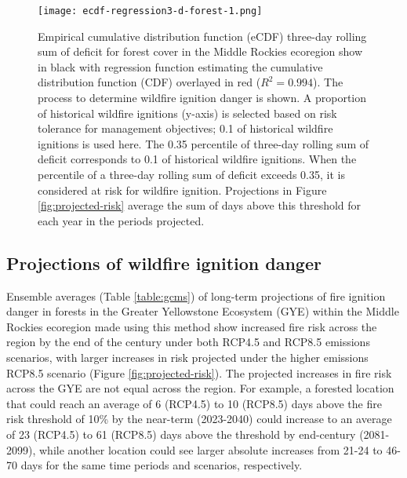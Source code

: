 \documentclass[11p]{article}
\begin{document}
\begin{table}
{\begin{figure}[!htbp]
  \centering
  \texttt{[image: ecdf-regression3-d-forest-1.png]}
  \caption{Empirical cumulative distribution function (eCDF) three-day rolling sum of deficit for forest cover in the Middle Rockies ecoregion show in black with regression function estimating the cumulative distribution function (CDF) overlayed in red ($R^2 = 0.994$). The process to determine wildfire ignition danger is shown. A proportion of historical wildfire ignitions (y-axis) is selected based on risk tolerance for management objectives; 0.1 of historical wildfire ignitions is used here. The 0.35 percentile of three-day rolling sum of deficit corresponds to 0.1 of historical wildfire ignitions. When the percentile of a three-day rolling sum of deficit exceeds 0.35, it is considered at risk for wildfire ignition. Projections in Figure \ref{fig:projected-risk} average the sum of days above this threshold for each year in the periods projected.}
  \label{fig:ecdf}
\end{figure}

\subsection{Projections of wildfire ignition danger}

Ensemble averages (Table \ref{table:gcms}) of long-term projections of fire ignition danger in forests in the Greater Yellowstone Ecosystem (GYE) within the Middle Rockies ecoregion made using this method show increased fire risk across the region by the end of the century under both RCP4.5 and RCP8.5 emissions scenarios, with larger increases in risk projected under the higher emissions RCP8.5 scenario (Figure \ref{fig:projected-risk}). The projected increases in fire risk across the GYE are not equal across the region. For example, a forested location that could reach an average of 6 (RCP4.5) to 10 (RCP8.5) days above the fire risk threshold of 10\% by the near-term (2023-2040) could increase to an average of 23 (RCP4.5) to 61 (RCP8.5) days above the threshold by end-century (2081-2099), while another location could see larger absolute increases from 21-24 to 46-70 days for the same time periods and scenarios, respectively.

}
\end{table}
\end{document}
